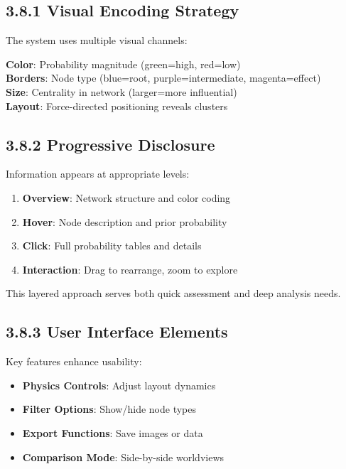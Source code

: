 \documentclass[
  11pt,
  letterpaper,
]{book}
\providecommand{\tightlist}{%
  \setlength{\itemsep}{0pt}\setlength{\parskip}{0pt}}
\begin{document}
\subsection*{3.8.1 Visual Encoding Strategy}\label{sec-visual-encoding}

The system uses multiple visual channels:

\textbf{Color}: Probability magnitude (green=high, red=low)\\
\textbf{Borders}: Node type (blue=root, purple=intermediate,
magenta=effect)\\
\textbf{Size}: Centrality in network (larger=more influential)\\
\textbf{Layout}: Force-directed positioning reveals clusters

\subsection*{3.8.2 Progressive
Disclosure}\label{sec-progressive-disclosure}

Information appears at appropriate levels:

\begin{enumerate}
\def\labelenumi{\arabic{enumi}.}
\tightlist
\item
  \textbf{Overview}: Network structure and color coding
\item
  \textbf{Hover}: Node description and prior probability
\item
  \textbf{Click}: Full probability tables and details
\item
  \textbf{Interaction}: Drag to rearrange, zoom to explore
\end{enumerate}

This layered approach serves both quick assessment and deep analysis
needs.

\subsection*{3.8.3 User Interface Elements}\label{sec-ui-elements}

Key features enhance usability:

\begin{itemize}
\tightlist
\item
  \textbf{Physics Controls}: Adjust layout dynamics
\item
  \textbf{Filter Options}: Show/hide node types
\item
  \textbf{Export Functions}: Save images or data
\item
  \textbf{Comparison Mode}: Side-by-side worldviews
\end{itemize}
\end{document}
